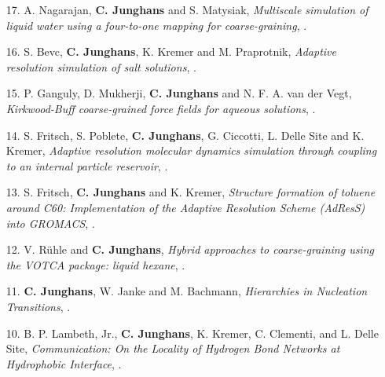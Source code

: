 \documentclass{article}
\begin{document}
\begin{enumerate}
\item[17.] A. Nagarajan, \textbf{C. Junghans} and S. Matysiak,
  \textit{Multiscale simulation of liquid water using a four-to-one mapping for coarse-graining},
  .

\item[16.] S. Bevc, \textbf{C. Junghans}, K. Kremer and M. Praprotnik,
  \textit{Adaptive resolution simulation of salt solutions},
  .

\item[15.] P. Ganguly, D. Mukherji, \textbf{C. Junghans} and N. F. A. van der Vegt,
  \textit{Kirkwood-Buff coarse-grained force fields for aqueous solutions},
  .

\item[14.] S. Fritsch, S. Poblete, \textbf{C. Junghans}, G. Ciccotti, L. Delle Site and K. Kremer,
  \textit{Adaptive resolution molecular dynamics simulation through coupling to an internal particle reservoir},
  .

\item[13.] S. Fritsch, \textbf{C. Junghans} and K. Kremer,
  \textit{Structure formation of toluene around C60: Implementation of the Adaptive Resolution Scheme (AdResS) into GROMACS},
  .

\item[12.] V. R{\"u}hle and \textbf{C. Junghans},
  \textit{Hybrid approaches to coarse-graining using the VOTCA package: liquid hexane},
  .

\item[11.] \textbf{C. Junghans}, W. Janke and M. Bachmann,
  \textit{Hierarchies in Nucleation Transitions},
  .

\item[10.] B. P. Lambeth, Jr., \textbf{C. Junghans}, K. Kremer, C. Clementi, and L. Delle Site, 
  \textit{Communication: On the Locality of Hydrogen Bond Networks at Hydrophobic Interface},
  .


\end{enumerate}
\end{document}
